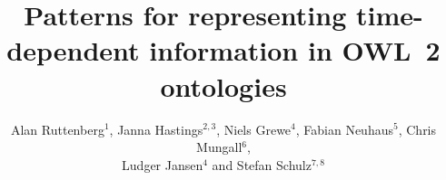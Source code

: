 \documentclass[10pt]{bmc_article}
\newenvironment{bmcformat}{\baselineskip20pt\sloppy\setboolean{publ}{false}}{\baselineskip20pt\sloppy}
\begin{document}
\begin{bmcformat}





\title{Patterns for representing time-dependent information in OWL~2 ontologies}

 

\author{Alan Ruttenberg\correspondingauthor$^1$,%
  Janna Hastings$^{2,3}$,%
  Niels Grewe$^{4}$,%
  Fabian Neuhaus$^{5}$,%
  Chris Mungall$^{6}$,%
   \\
  Ludger Jansen$^{4}$%
   and
  Stefan Schulz$^{7,8}$%
}
   

\address{%
    \iid(1)Institute for Health Informatics, State University of New York, Buffalo, NY, USA\\
    \iid(2)Cheminformatics and Metabolism, European Bioinformatics Insitute (EMBL-EBI), Cambridge, UK\\
    \iid(3)Department of Philosophy, University of Geneva, Switzerland\\
    \iid(4)Institute of Philosophy, University of Rostock, Germany\\
    \iid(5)National Institute of Standards and Technology\\
    \iid(6)Genomics Division, Lawrence Berkeley National Laboratory, Berkeley, CA, USA\\
    \iid(7)Institute for Medical Informatics,
Statistics and Documentation, Medical University of Graz, Austria\\
    \iid(8)Institute of Medical Biometry and Medical Informatics, University Medical Center Freiburg, Germany
}%


\end{bmcformat}
\end{document}
